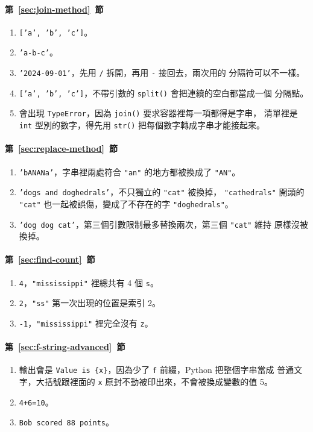 \paragraph{第~\ref{sec:join-method}~節}
\begin{enumerate}
\item \texttt{['a', 'b', 'c']}。
\item \texttt{'a-b-c'}。
\item \texttt{'2024-09-01'}，先用 \texttt{/} 拆開，再用 \texttt{-} 接回去，兩次用的
分隔符可以不一樣。
\item \texttt{['a', 'b', 'c']}，不帶引數的 \texttt{split()} 會把連續的空白都當成一個
分隔點。
\item 會出現 \texttt{TypeError}，因為 \texttt{join()} 要求容器裡每一項都得是字串，
清單裡是 \texttt{int} 型別的數字，得先用 \texttt{str()} 把每個數字轉成字串才能接起來。
\end{enumerate}

\paragraph{第~\ref{sec:replace-method}~節}
\begin{enumerate}
\item \texttt{'bANANa'}，字串裡兩處符合 \texttt{"an"} 的地方都被換成了 \texttt{"AN"}。
\item \texttt{'dogs and doghedrals'}，不只獨立的 \texttt{"cat"} 被換掉，
\texttt{"cathedrals"} 開頭的 \texttt{"cat"} 也一起被誤傷，變成了不存在的字
\texttt{"doghedrals"}。
\item \texttt{'dog dog cat'}，第三個引數限制最多替換兩次，第三個 \texttt{"cat"} 維持
原樣沒被換掉。
\end{enumerate}

\paragraph{第~\ref{sec:find-count}~節}
\begin{enumerate}
\item \texttt{4}，\texttt{"mississippi"} 裡總共有 4 個 \texttt{s}。
\item \texttt{2}，\texttt{"ss"} 第一次出現的位置是索引 2。
\item \texttt{-1}，\texttt{"mississippi"} 裡完全沒有 \texttt{z}。
\end{enumerate}

\paragraph{第~\ref{sec:f-string-advanced}~節}
\begin{enumerate}
\item 輸出會是 \texttt{Value is \{x\}}，因為少了 \texttt{f} 前綴，Python 把整個字串當成
普通文字，大括號跟裡面的 \texttt{x} 原封不動被印出來，不會被換成變數的值 5。
\item \texttt{4+6=10}。
\item \texttt{Bob scored 88 points}。
\end{enumerate}

